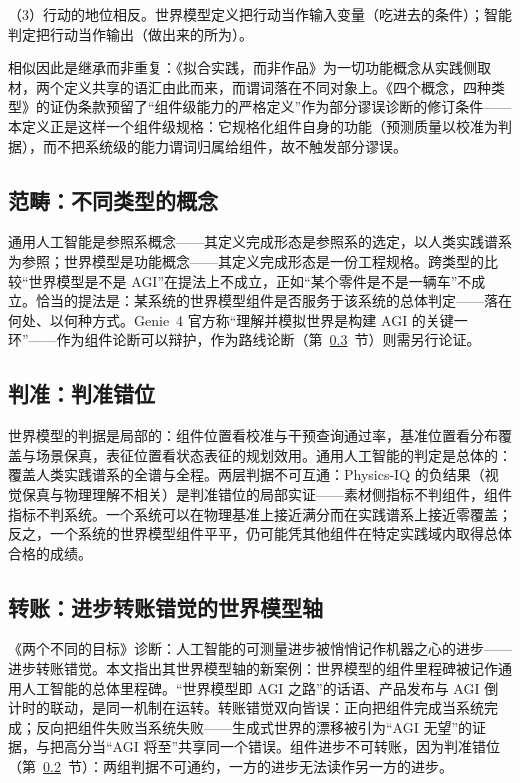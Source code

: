 \documentclass[10pt,fontset=fandol]{ctexart}
\begin{document}
（3）行动的地位相反。世界模型定义把行动当作输入变量（吃进去的条件）；智能判定把行动当作输出（做出来的所为）。

相似因此是继承而非重复：《拟合实践，而非作品》\cite{yu2026fitting}为一切功能概念从实践侧取材，两个定义共享的语汇由此而来，而谓词落在不同对象上。《四个概念，四种类型》的证伪条款预留了“组件级能力的严格定义”作为部分谬误诊断的修订条件——本定义正是这样一个组件级规格：它规格化组件自身的功能（预测质量以校准为判据），而不把系统级的能力谓词归属给组件，故不触发部分谬误。

\subsection{范畴：不同类型的概念}\label{sec:category}

通用人工智能是参照系概念——其定义完成形态是参照系的选定，以人类实践谱系为参照\cite{yu2026fourconcepts}；世界模型是功能概念——其定义完成形态是一份工程规格。跨类型的比较“世界模型是不是 AGI”在提法上不成立，正如“某个零件是不是一辆车”不成立。恰当的提法是：某系统的世界模型组件是否服务于该系统的总体判定——落在何处、以何种方式。Genie~4 官方称“理解并模拟世界是构建 AGI 的关键一环”\cite{deepmind2026genie4}——作为组件论断可以辩护，作为路线论断（第~\ref{sec:transfer}~节）则需另行论证。

\subsection{判准：判准错位}\label{sec:criteria}

世界模型的判据是局部的：组件位置看校准与干预查询通过率，基准位置看分布覆盖与场景保真，表征位置看状态表征的规划效用。通用人工智能的判定是总体的：覆盖人类实践谱系的全谱与全程\cite{yu2026fitting}。两层判据不可互通：Physics-IQ 的负结果（视觉保真与物理理解不相关\cite{motamed2025physicsiq}）是判准错位的局部实证——素材侧指标不判组件，组件指标不判系统。一个系统可以在物理基准上接近满分而在实践谱系上接近零覆盖；反之，一个系统的世界模型组件平平，仍可能凭其他组件在特定实践域内取得总体合格的成绩。

\subsection{转账：进步转账错觉的世界模型轴}\label{sec:transfer}

《两个不同的目标》\cite{yu2026twogoals}诊断：人工智能的可测量进步被悄悄记作机器之心的进步——进步转账错觉。本文指出其世界模型轴的新案例：世界模型的组件里程碑被记作通用人工智能的总体里程碑。“世界模型即 AGI 之路”的话语、产品发布与 AGI 倒计时的联动，是同一机制在运转。转账错觉双向皆误：正向把组件完成当系统完成；反向把组件失败当系统失败——生成式世界的漂移被引为“AGI 无望”的证据，与把高分当“AGI 将至”共享同一个错误。组件进步不可转账，因为判准错位（第~\ref{sec:criteria}~节）：两组判据不可通约，一方的进步无法读作另一方的进步。
\end{document}
